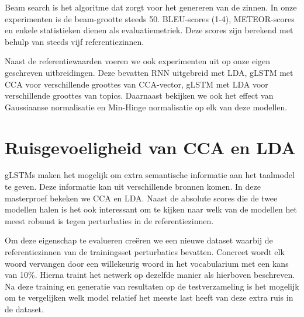 Beam search is het algoritme dat zorgt voor het genereren van de zinnen. In onze experimenten is de beam-grootte steeds 50.
BLEU-scores (1-4), METEOR-scores en enkele statistieken dienen als evaluatiemetriek. Deze scores zijn berekend met behulp van steeds vijf referentiezinnen.

Naast de referentiewaarden voeren we ook experimenten uit op onze eigen geschreven uitbreidingen.
Deze bevatten RNN uitgebreid met LDA, gLSTM met CCA voor verschillende groottes van CCA-vector, gLSTM met LDA voor verschillende groottes van topics. Daarnaast bekijken we ook het effect van Gaussiaanse normalisatie en Min-Hinge normalisatie op elk van deze modellen.

\section{Ruisgevoeligheid van CCA en LDA} %
\label{sec:ruisgevoeligheid_van_cca_en_lda}
gLSTMs maken het mogelijk om extra semantische informatie aan het taalmodel te geven. Deze informatie kan uit verschillende bronnen komen. In deze masterproef bekeken we CCA en LDA. Naast de absolute scores die de twee modellen halen is het ook interessant om te kijken naar welk van de modellen het meest robuust is tegen perturbaties in de referentiezinnen.

Om deze eigenschap te evalueren cre\"eren we een nieuwe dataset waarbij de referentiezinnen van de trainingsset perturbaties bevatten.
Concreet wordt elk woord vervangen door een willekeurig woord in het vocabularium met een kans van 10\%. Hierna traint het netwerk op dezelfde manier als hierboven beschreven. Na deze training en generatie van resultaten op de testverzameling is het mogelijk om te vergelijken welk model relatief het meeste last heeft van deze extra ruis in de dataset.


